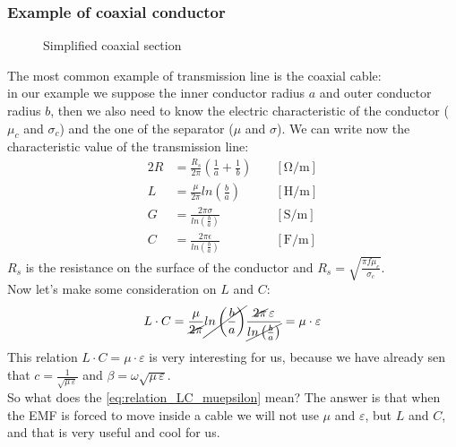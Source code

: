 \subsubsection*{Example of coaxial conductor}
\begin{figure}[H]
    \begin{center}
  \end{center}\caption{Simplified coaxial section}
\end{figure}
The most common example of transmission line is the coaxial cable:\\
in our example we suppose the inner conductor radius $a$ and outer conductor radius $b$, then we also need to know the electric characteristic of the conductor ($\mu_c$ and $\sigma_c$) and the one of the separator ($\mu$ and $\sigma $). We can write now the characteristic value of the transmission line:
\begin{alignat*}{2}
    R&=\frac{R_s}{2\pi}\left(\frac{1}{a}+\frac{1}{b}\right)\;&&   \left[\si{\ohm\per\metre}\right]\\[5pt]
    L&=\frac{\mu}{2\pi}ln \left(\frac{b}{a}\right)&& \left[\si{\henry\per\metre}\right]\\[5pt]
    G&=\frac{2\pi\sigma}{ln\left(\frac{b}{a}\right)}&&\left[\si{\siemens\per\metre}\right]\\[5pt]
    C&=\frac{2\pi \epsilon}{ln\left(\frac{b}{a}\right)}&&\left[\si{\farad\per\metre}\right]
\end{alignat*}
$R_s$ is the resistance on the surface of the conductor and $R_s=\sqrt{\frac{\pi f \mu_c}{\sigma_c}}$.\\
Now let's make some consideration on $L$ and $C$:
\begin{equation}\label{eq:relation_LC_muepsilon}
  L\cdot C=\frac{\mu}{\cancel{2\pi}}\cancel{ln\left(\frac{b}{a}\right)}\frac{\cancel{2\pi}\,\varepsilon}{\cancel{ln\left(\frac{b}{a}\right)}}=\mu\cdot\varepsilon
\end{equation}
This relation $L\cdot C= \mu\cdot\varepsilon$ is very interesting for us, because we have already sen that $c=\frac{1}{\sqrt{\mu\,\varepsilon}}$ and $\beta=\omega\sqrt{\mu\,\varepsilon}$.\\
So what does the \cref{eq:relation_LC_muepsilon} mean? The answer is that when the EMF is forced to move inside a cable we will not use $\mu$ and $\varepsilon$, but $L$ and $C$, and that is very useful and cool for us.
